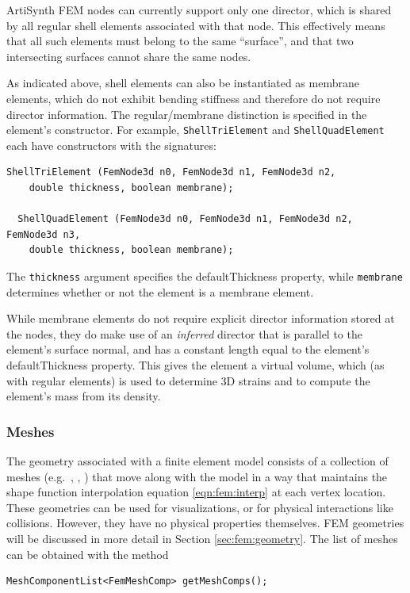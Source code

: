 \begin{sideblock}
ArtiSynth FEM nodes can currently support only one director, which
is shared by all regular shell elements associated with that
node. This effectively means that all such elements must belong to the
same ``surface'', and that two intersecting surfaces cannot share the
same nodes.
\end{sideblock}

As indicated above, shell elements can also be instantiated as
membrane elements, which do not exhibit bending stiffness and
therefore do not require director information. The regular/membrane
distinction is specified in the element's constructor.  For example,
{\tt ShellTriElement} and {\tt ShellQuadElement} each have
constructors with the signatures:
%
\begin{lstlisting}[]
  ShellTriElement (FemNode3d n0, FemNode3d n1, FemNode3d n2,
    double thickness, boolean membrane);

  ShellQuadElement (FemNode3d n0, FemNode3d n1, FemNode3d n2, FemNode3d n3,
    double thickness, boolean membrane);
\end{lstlisting}
%
The {\tt thickness} argument specifies the {\sf defaultThickness}
property, while {\tt membrane} determines whether or not the
element is a membrane element.

While membrane elements do not require explicit director information
stored at the nodes, they do make use of an {\it inferred} director
that is parallel to the element's surface normal, and has a constant
length equal to the element's {\sf defaultThickness} property. This
gives the element a virtual volume, which (as with regular elements)
is used to determine 3D strains and to compute the element's mass from
its density.

\subsubsection{Meshes}
\ifLaTeXML{\newline}

The geometry associated with a finite element model consists of a collection
of meshes (e.g.~, ,
) that move along with the
model in a way that maintains the shape function interpolation equation 
\eqref{eqn:fem:interp}
at each vertex location.  These geometries can be used for visualizations, or 
for physical interactions like collisions.  However, they have no physical 
properties themselves. FEM geometries will be discussed in more detail in 
Section \ref{sec:fem:geometry}.  The list of meshes can be obtained with the 
method
\begin{lstlisting}[]
  MeshComponentList<FemMeshComp> getMeshComps();
\end{lstlisting}

